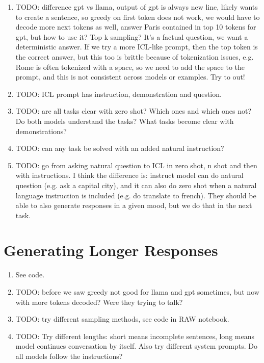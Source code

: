 \documentclass[11pt,a4paper]{article}
\begin{document}
\begin{enumerate}[label=(\alph*)]
    \item TODO: difference gpt vs llama, output of gpt is always new line,
          likely wants to create a sentence, so greedy on first token does not
          work, we would have to decode more next tokens as well, answer Paris
          contained in top 10 tokens for gpt, but how to use it? Top k sampling?
          It's a factual question, we want a deterministic answer.
          If we try a more ICL-like prompt, then the top token is the correct
          answer, but this too is brittle because of tokenization issues, e.g.
          Rome is often tokenized with a space, so we need to add the space to
          the prompt, and this is not consistent across models or examples.
          Try to out!
    \item TODO: ICL prompt has instruction, demonstration and question.
    \item TODO: are all tasks clear with zero shot? Which ones and which ones
          not? Do both models understand the tasks? What tasks become clear with
          demonstrations?
    \item TODO: can any task be solved with an added natural instruction?
    \item TODO: go from asking natural question to ICL in zero shot, n shot and
          then with instructions. I think the difference is: instruct model can
          do natural question (e.g. ask a capital city), and it can also do zero
          shot when a natural language instruction is included (e.g. do
          translate to french). They should be able to also generate
          responses in a given mood, but we do that in the next task.
\end{enumerate}

\section{Generating Longer Responses}

\begin{enumerate}[label=(\alph*)]
    \item See code.
    \item TODO: before we saw greedy not good for llama and gpt sometimes, but
          now with more tokens decoded? Were they trying to talk?
    \item TODO: try different sampling methods, see code in RAW notebook.
    \item TODO: Try different lengths: short means incomplete sentences, long
          means model continues conversation by itself. Also try different 
          system prompts. Do all models follow the instructions?  
\end{enumerate}
\end{document}
